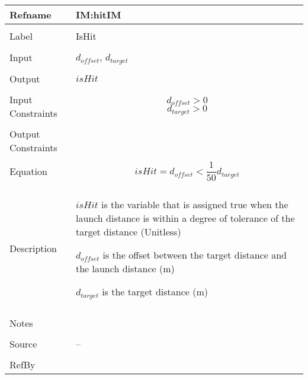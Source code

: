 \documentclass[12pt]{article}
\begin{document}
\noindent \begin{minipage}{\textwidth}
\begin{tabular}{p{} p{}}
\toprule \textbf{Refname} & \textbf{IM:hitIM}
\label{IM:hitIM}
\\ \midrule \\
Label & IsHit
\\ \midrule \\
Input & ${d_{offset}}$, ${d_{target}}$
\\ \midrule \\
Output & $isHit$
\\ \midrule \\
Input Constraints & \begin{displaymath}
                    {d_{offset}}>0
                    \end{displaymath}
                    \begin{displaymath}
                    {d_{target}}>0
                    \end{displaymath}
\\ \midrule \\
Output Constraints & 
\\ \midrule \\
Equation & \begin{displaymath}
           isHit={d_{offset}}<\frac{1}{50} {d_{target}}
           \end{displaymath}
\\ \midrule \\
Description & \begin{symbDescription}
              \item{$isHit$ is the variable that is assigned true when the launch distance is within a degree of tolerance of the target distance (Unitless)}
              \item{${d_{offset}}$ is the offset between the target distance and the launch distance (m)}
              \item{${d_{target}}$ is the target distance (m)}
              \end{symbDescription}
\\ \midrule \\
Notes & 
\\ \midrule \\
Source & --
\\ \midrule \\
RefBy & 
\\ \bottomrule \end{tabular}
\end{minipage}
\end{document}
